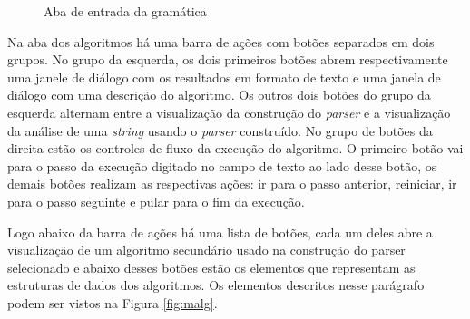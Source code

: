 \begin{figure}[ht]
  \centering
  \captionsetup{width=16cm}
  \caption{Aba de entrada da gramática}
  \label{fig:mgrammar}
\end{figure}

Na aba dos algoritmos há uma barra de ações com botões separados em dois grupos. No grupo da esquerda, os dois primeiros botões abrem respectivamente uma janele de diálogo com os resultados em formato de texto e uma janela de diálogo com uma descrição do algoritmo. Os outros dois botões do grupo da esquerda alternam entre a visualização da construção do \textit{parser} e a visualização da análise de uma \textit{string} usando o \textit{parser} construído. No grupo de botões da direita estão os controles de fluxo da execução do algoritmo. O primeiro botão vai para o passo da execução digitado no campo de texto ao lado desse botão, os demais botões realizam as respectivas ações: ir para o passo anterior, reiniciar, ir para o passo seguinte e pular para o fim da execução.

Logo abaixo da barra de ações há uma lista de botões, cada um deles abre a visualização de um algoritmo secundário usado na construção do parser selecionado e abaixo desses botões estão os elementos que representam as estruturas de dados dos algoritmos. Os elementos descritos nesse parágrafo podem ser vistos na Figura \ref{fig:malg}.

